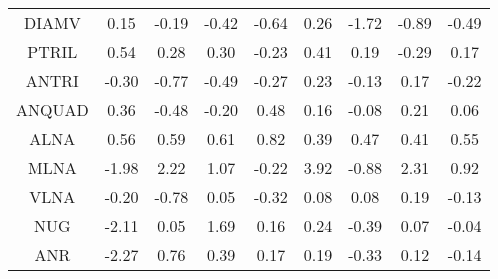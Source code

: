 \begin{longtable}{ | c || c | c | c | c | c | c | c || c |}
DIAMV &  \cellcolor[HTML]{FFFFFF} 0.15 &  \cellcolor[HTML]{FFF7F7} -0.19 &  \cellcolor[HTML]{FFF7F7} -0.42 &  \cellcolor[HTML]{FFEFEF} -0.64 &  \cellcolor[HTML]{F7F7FF} 0.26 &  \cellcolor[HTML]{FFD7D7} -1.72 &  \cellcolor[HTML]{FFE7E7} -0.89 &  \cellcolor[HTML]{FFEFEF} -0.49 \\
PTRIL &  \cellcolor[HTML]{EFEFFF} 0.54 &  \cellcolor[HTML]{F7F7FF} 0.28 &  \cellcolor[HTML]{F7F7FF} 0.30 &  \cellcolor[HTML]{FFF7F7} -0.23 &  \cellcolor[HTML]{F7F7FF} 0.41 &  \cellcolor[HTML]{F7F7FF} 0.19 &  \cellcolor[HTML]{FFF7F7} -0.29 &  \cellcolor[HTML]{F7F7FF} 0.17 \\
ANTRI &  \cellcolor[HTML]{FFF7F7} -0.30 &  \cellcolor[HTML]{FFEFEF} -0.77 &  \cellcolor[HTML]{FFEFEF} -0.49 &  \cellcolor[HTML]{FFF7F7} -0.27 &  \cellcolor[HTML]{F7F7FF} 0.23 &  \cellcolor[HTML]{FFFFFF} -0.13 &  \cellcolor[HTML]{F7F7FF} 0.17 &  \cellcolor[HTML]{FFF7F7} -0.22 \\
ANQUAD &  \cellcolor[HTML]{F7F7FF} 0.36 &  \cellcolor[HTML]{FFEFEF} -0.48 &  \cellcolor[HTML]{FFF7F7} -0.20 &  \cellcolor[HTML]{F7F7FF} 0.48 &  \cellcolor[HTML]{F7F7FF} 0.16 &  \cellcolor[HTML]{FFFFFF} -0.08 &  \cellcolor[HTML]{F7F7FF} 0.21 &  \cellcolor[HTML]{FFFFFF} 0.06 \\
ALNA &  \cellcolor[HTML]{EFEFFF} 0.56 &  \cellcolor[HTML]{EFEFFF} 0.59 &  \cellcolor[HTML]{EFEFFF} 0.61 &  \cellcolor[HTML]{E7E7FF} 0.82 &  \cellcolor[HTML]{F7F7FF} 0.39 &  \cellcolor[HTML]{F7F7FF} 0.47 &  \cellcolor[HTML]{F7F7FF} 0.41 &  \cellcolor[HTML]{EFEFFF} 0.55 \\
MLNA &  \cellcolor[HTML]{FFCFCF} -1.98 &  \cellcolor[HTML]{C7C7FF} 2.22 &  \cellcolor[HTML]{E7E7FF} 1.07 &  \cellcolor[HTML]{FFF7F7} -0.22 &  \cellcolor[HTML]{9F9FFF} 3.92 &  \cellcolor[HTML]{FFE7E7} -0.88 &  \cellcolor[HTML]{C7C7FF} 2.31 &  \cellcolor[HTML]{E7E7FF} 0.92 \\
VLNA &  \cellcolor[HTML]{FFF7F7} -0.20 &  \cellcolor[HTML]{FFEFEF} -0.78 &  \cellcolor[HTML]{FFFFFF} 0.05 &  \cellcolor[HTML]{FFF7F7} -0.32 &  \cellcolor[HTML]{FFFFFF} 0.08 &  \cellcolor[HTML]{FFFFFF} 0.08 &  \cellcolor[HTML]{F7F7FF} 0.19 &  \cellcolor[HTML]{FFFFFF} -0.13 \\
NUG &  \cellcolor[HTML]{FFC7C7} -2.11 &  \cellcolor[HTML]{FFFFFF} 0.05 &  \cellcolor[HTML]{D7D7FF} 1.69 &  \cellcolor[HTML]{FFFFFF} 0.16 &  \cellcolor[HTML]{F7F7FF} 0.24 &  \cellcolor[HTML]{FFF7F7} -0.39 &  \cellcolor[HTML]{FFFFFF} 0.07 &  \cellcolor[HTML]{FFFFFF} -0.04 \\
ANR &  \cellcolor[HTML]{FFC7C7} -2.27 &  \cellcolor[HTML]{EFEFFF} 0.76 &  \cellcolor[HTML]{F7F7FF} 0.39 &  \cellcolor[HTML]{F7F7FF} 0.17 &  \cellcolor[HTML]{F7F7FF} 0.19 &  \cellcolor[HTML]{FFF7F7} -0.33 &  \cellcolor[HTML]{FFFFFF} 0.12 &  \cellcolor[HTML]{FFFFFF} -0.14 \\

\end{longtable}
